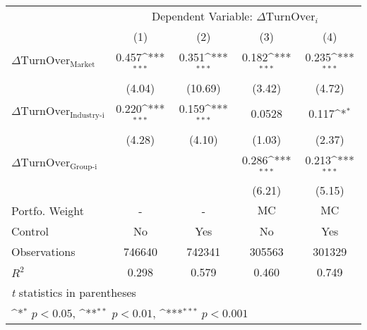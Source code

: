 {
\def\sym#1{\ifmmode^{#1}\else\(^{#1}\)\fi}
\begin{tabular}{l*{4}{c}}
\hline\hline
                    &\multicolumn{4}{c}{Dependent Variable: $\Delta \text{TurnOver}_{i} $ }                 \\\cmidrule(lr){2-5}
                    &\multicolumn{1}{c}{(1)}         &\multicolumn{1}{c}{(2)}         &\multicolumn{1}{c}{(3)}         &\multicolumn{1}{c}{(4)}         \\
\hline
 $ \Delta \text{TurnOver}_{\text{Market}} $ &       0.457\sym{***}&       0.351\sym{***}&       0.182\sym{***}&       0.235\sym{***}\\
                    &      (4.04)         &     (10.69)         &      (3.42)         &      (4.72)         \\
[1em]
 $ \Delta \text{TurnOver}_{\text{Industry-i}} $ &       0.220\sym{***}&       0.159\sym{***}&      0.0528         &       0.117\sym{*}  \\
                    &      (4.28)         &      (4.10)         &      (1.03)         &      (2.37)         \\
[1em]
 $ \Delta \text{TurnOver}_{\text{Group-i}} $ &                     &                     &       0.286\sym{***}&       0.213\sym{***}\\
                    &                     &                     &      (6.21)         &      (5.15)         \\
\hline
Portfo. Weight      &           -         &           -         & $ \text{MC} $          & $ \text{MC} $          \\
Control             &          No         &         Yes         &          No         &         Yes         \\
Observations        &      746640         &      742341         &      305563         &      301329         \\
$ R^2 $             &       0.298         &       0.579         &       0.460         &       0.749         \\
\hline\hline
\multicolumn{5}{l}{\footnotesize \textit{t} statistics in parentheses}\\
\multicolumn{5}{l}{\footnotesize \sym{*} \(p<0.05\), \sym{**} \(p<0.01\), \sym{***} \(p<0.001\)}\\
\end{tabular}
}
